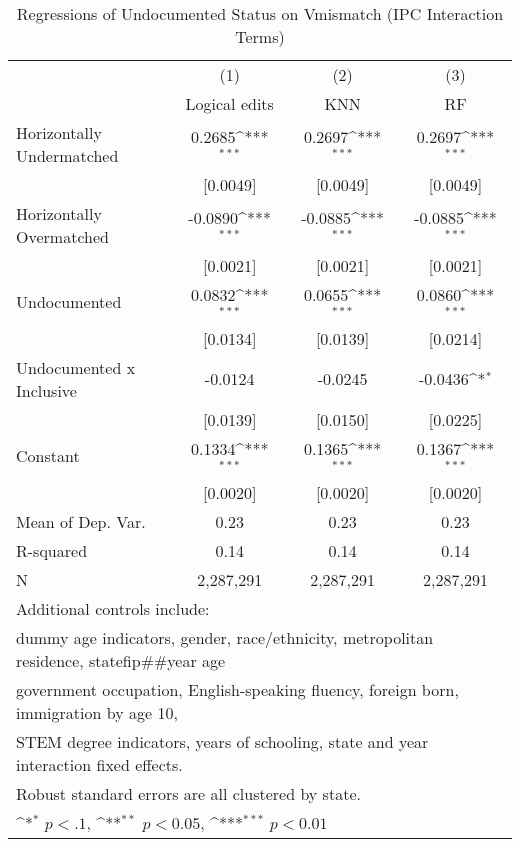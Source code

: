 \begin{table}[htbp]\centering
\def\sym#1{\ifmmode^{#1}\else\(^{#1}\)\fi}
\caption{Regressions of Undocumented Status on Vmismatch (IPC Interaction Terms)}
\begin{tabular}{l*{3}{c}}
\toprule
                    &\multicolumn{1}{c}{(1)}         &\multicolumn{1}{c}{(2)}         &\multicolumn{1}{c}{(3)}         \\
                    &Logical edits         &         KNN         &          RF         \\
\midrule
Horizontally Undermatched&      0.2685\sym{***}&      0.2697\sym{***}&      0.2697\sym{***}\\
                    &    [0.0049]         &    [0.0049]         &    [0.0049]         \\
\addlinespace
Horizontally Overmatched&     -0.0890\sym{***}&     -0.0885\sym{***}&     -0.0885\sym{***}\\
                    &    [0.0021]         &    [0.0021]         &    [0.0021]         \\
\addlinespace
Undocumented        &      0.0832\sym{***}&      0.0655\sym{***}&      0.0860\sym{***}\\
                    &    [0.0134]         &    [0.0139]         &    [0.0214]         \\
\addlinespace
Undocumented x Inclusive&     -0.0124         &     -0.0245         &     -0.0436\sym{*}  \\
                    &    [0.0139]         &    [0.0150]         &    [0.0225]         \\
\addlinespace
Constant            &      0.1334\sym{***}&      0.1365\sym{***}&      0.1367\sym{***}\\
                    &    [0.0020]         &    [0.0020]         &    [0.0020]         \\
\midrule
Mean of Dep. Var.   &        0.23         &        0.23         &        0.23         \\
R-squared           &        0.14         &        0.14         &        0.14         \\
N                   &   2,287,291         &   2,287,291         &   2,287,291         \\
\bottomrule
\multicolumn{4}{l}{\footnotesize Additional controls include:}\\
\multicolumn{4}{l}{\footnotesize dummy age indicators, gender, race/ethnicity, metropolitan residence, statefip##year age}\\
\multicolumn{4}{l}{\footnotesize government occupation, English-speaking fluency, foreign born, immigration by age 10,}\\
\multicolumn{4}{l}{\footnotesize STEM degree indicators, years of schooling, state and year interaction fixed effects.}\\
\multicolumn{4}{l}{\footnotesize Robust standard errors are all clustered by state.}\\
\multicolumn{4}{l}{\footnotesize \sym{*} \(p<.1\), \sym{**} \(p<0.05\), \sym{***} \(p<0.01\)}\\
\end{tabular}
\end{table}
